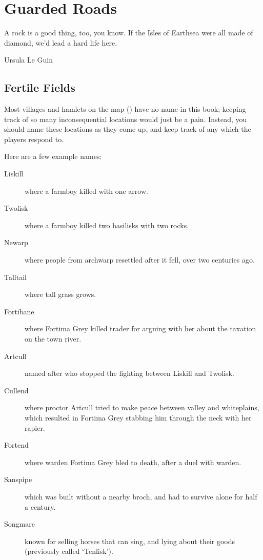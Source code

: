 \chapter{Guarded Roads}
\epigraph{A rock is a good thing, too, you know. If the Isles of Earthsea were all made of diamond, we'd lead a hard life here.}{Ursula Le Guin}
\label{roadsChapter}


\section{Fertile Fields}

\begin{multicols}{2}

\noindent
Most \glspl{village} and hamlets on the map () have no name in this book; keeping track of so many inconsequential locations would just be a pain.
Instead, you should name these locations as they come up, and keep track of any which the players respond to.

Here are a few example names:

\begin{description}
	\item[Liskill]
  where a farmboy killed  with one arrow.
	\item[Twolisk]
  where a farmboy killed two \glspl{basilisk} with two rocks.
	\item[Newarp]
  where people from \gls{archwarp} resettled after it fell, over two centuries ago.
	\item[Talltail]
  where tall grass grows.
	\item[Fortibane]
  where Fortima Grey killed  trader for arguing with her about the taxation on the \gls{town} river.
	\item[Artcull]
  named after  who stopped the fighting between Liskill and Twolisk.
	\item[Cullend]
  where \Gls{proctor} Artcull tried to make peace between \gls{valley} and \gls{whiteplains}, which resulted in Fortima Grey stabbing him through the neck with her rapier.
	\item[Fortend]
  where \Gls{warden} Fortima Grey bled to death, after a duel with  \gls{warden}.
	\item[Sanspipe]
  which was built without a nearby \gls{broch}, and had to survive alone for half a century.
	\item[Songmare]
  known for selling horses that can sing, and lying about their goods (previously called `Tenlisk').
\end{description}

\end{multicols}
